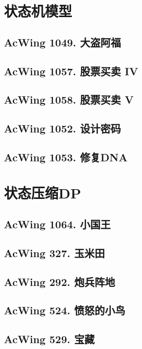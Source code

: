 \section{状态机模型}

\subsection{AcWing 1049. 大盗阿福}

\subsection{AcWing 1057. 股票买卖 IV}

\subsection{AcWing 1058. 股票买卖 V}

\subsection{AcWing 1052. 设计密码}

\subsection{AcWing 1053. 修复DNA}


\section{状态压缩DP}

\subsection{AcWing 1064. 小国王}

\subsection{AcWing 327. 玉米田}

\subsection{AcWing 292. 炮兵阵地}

\subsection{AcWing 524. 愤怒的小鸟}

\subsection{AcWing 529. 宝藏}


